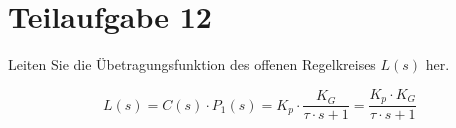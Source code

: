 \section{Teilaufgabe 12}
\begin{aufgabe}
    Leiten Sie die Übetragungsfunktion des offenen Regelkreises $L(s)$ her.
\end{aufgabe}
\[ L(s) = C(s) \cdot P_1(s) = K_p \cdot \frac{K_G}{\tau \cdot s + 1} 
    = \frac{K_p \cdot K_G}{\tau \cdot s + 1} \]
